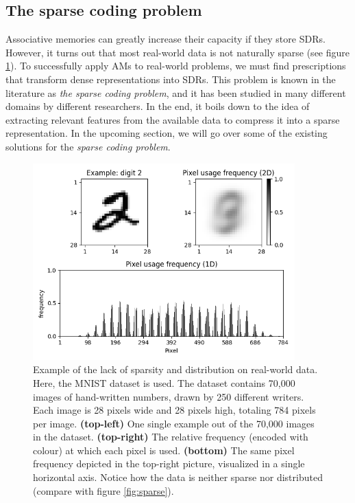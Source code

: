 \documentclass[runningheads]{llncs}
\begin{document}
\subsection{The sparse coding problem}
\label{sec:inputoutput_problem}
Associative memories can greatly increase their capacity if they store SDRs. However, it turns out that most real-world data is not naturally sparse (see figure \ref{fig:mnist}). To successfully apply AMs to real-world problems, we must find prescriptions that transform dense representations into SDRs. This problem is known in the literature as \textit{the sparse coding problem}, and it has been studied in many different domains by different researchers. In the end, it boils down to the idea of extracting relevant features from the available data to compress it into a sparse representation. In the upcoming section, we will go over some of the existing solutions for the \textit{sparse coding problem}.

\begin{figure}[h]
    \centering
    \includegraphics[width=0.9\textwidth]{img/MNIST.png}
    \caption{ Example of the lack of sparsity and distribution on real-world data. Here, the MNIST dataset \cite{lecun1998mnist} is used. The dataset contains 70,000 images of hand-written numbers, drawn by 250 different writers. Each image is 28 pixels wide and 28 pixels high, totaling 784 pixels per image.
    \textbf{(top-left)} One single example out of the 70,000 images in the dataset. 
    \textbf{(top-right)} The relative frequency (encoded with colour) at which each pixel is used. 
    \textbf{(bottom)} The same pixel frequency depicted in the top-right picture, visualized in a single horizontal axis. Notice how the data is neither sparse nor distributed (compare with figure \ref{fig:sparse}).}
\label{fig:mnist}
\end{figure}
\end{document}
